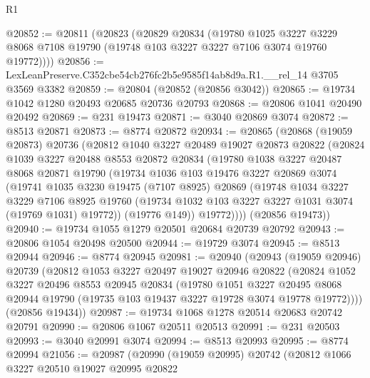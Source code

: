 \begin{lexlean}{R1}
\begin{coremodule}
@20852 := @20811
    (@20823
      (@20829
        @20834
        (@19780
          @1025
          @3227
          @3229
          @8068
          @7108
          @19790
          (@19748 @103 @3227 @3227 @7106 @3074 @19760 @19772))))
@20856 := LexLeanPreserve.C352cbe54cb276fc2b5e9585f14ab8d9a.R1.__rel_14 @3705 @3569 @3382
@20859 := @20804 (@20852 (@20856 @3042))
@20865 := @19734 @1042 @1280 @20493 @20685 @20736 @20793
@20868 := @20806 @1041 @20490 @20492
@20869 := @231 @19473
@20871 := @3040 @20869 @3074
@20872 := @8513 @20871
@20873 := @8774 @20872
@20934 := @20865
    (@20868
      (@19059 @20873)
      @20736
      (@20812
        @1040
        @3227
        @20489
        @19027
        @20873
        @20822
        (@20824
          @1039
          @3227
          @20488
          @8553
          @20872
          @20834
          (@19780
            @1038
            @3227
            @20487
            @8068
            @20871
            @19790
            (@19734
              @1036
              @103
              @19476
              @3227
              @20869
              @3074
              (@19741
                @1035
                @3230
                @19475
                (@7107 @8925)
                @20869
                (@19748
                  @1034
                  @3227
                  @3229
                  @7106
                  @8925
                  @19760
                  (@19734 @1032 @103 @3227 @3227 @1031 @3074 (@19769 @1031) @19772))
                (@19776 @149))
              @19772))))
      (@20856 @19473))
@20940 := @19734 @1055 @1279 @20501 @20684 @20739 @20792
@20943 := @20806 @1054 @20498 @20500
@20944 := @19729 @3074
@20945 := @8513 @20944
@20946 := @8774 @20945
@20981 := @20940
    (@20943
      (@19059 @20946)
      @20739
      (@20812
        @1053
        @3227
        @20497
        @19027
        @20946
        @20822
        (@20824
          @1052
          @3227
          @20496
          @8553
          @20945
          @20834
          (@19780
            @1051
            @3227
            @20495
            @8068
            @20944
            @19790
            (@19735 @103 @19437 @3227 @19728 @3074 @19778 @19772))))
      (@20856 @19434))
@20987 := @19734 @1068 @1278 @20514 @20683 @20742 @20791
@20990 := @20806 @1067 @20511 @20513
@20991 := @231 @20503
@20993 := @3040 @20991 @3074
@20994 := @8513 @20993
@20995 := @8774 @20994
@21056 := @20987
    (@20990
      (@19059 @20995)
      @20742
      (@20812
        @1066
        @3227
        @20510
        @19027
        @20995
        @20822

\end{coremodule}
\end{lexlean}
